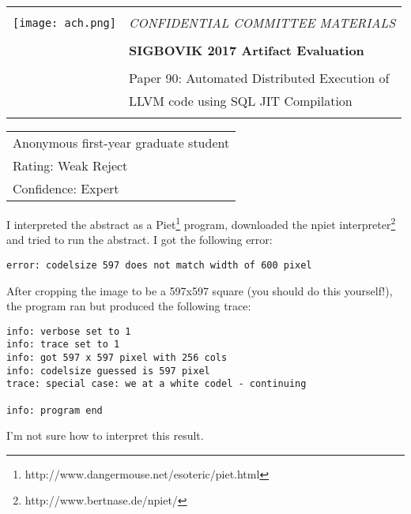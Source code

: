 \documentclass[12pt]{article}
\begin{document}
{\sffamily
\begin{tabular}{ll}
\multirow{3}{*}{\texttt{[image: ach.png]}}\\
& \Large{\em CONFIDENTIAL COMMITTEE MATERIALS} \\
&\\
& \textbf{\Huge{SIGBOVIK 2017 Artifact Evaluation}} \\
&\\
& \LARGE{Paper 90: Automated Distributed Execution of} \\
& \LARGE{LLVM code using SQL JIT Compilation} \\
&\\
\hline
\end{tabular}}
\vspace{2em}
\thispagestyle{empty}

{\large\bf
\begin{tabular}{l}
Anonymous first-year graduate student\\
Rating: Weak Reject \\
Confidence: Expert\\
\end{tabular}}
\vspace{1em}

I interpreted the abstract as a Piet\footnote{http://www.dangermouse.net/esoteric/piet.html}
program, downloaded the npiet interpreter\footnote{http://www.bertnase.de/npiet/}
and tried to run the abstract. I got the following error:

\begin{verbatim}
error: codelsize 597 does not match width of 600 pixel
\end{verbatim}

After cropping the image to be a 597x597 square (you should do this yourself!),
the program ran but produced the following trace:

\begin{verbatim}
info: verbose set to 1
info: trace set to 1
info: got 597 x 597 pixel with 256 cols
info: codelsize guessed is 597 pixel
trace: special case: we at a white codel - continuing

info: program end
\end{verbatim}

I'm not sure how to interpret this result.
\end{document}
